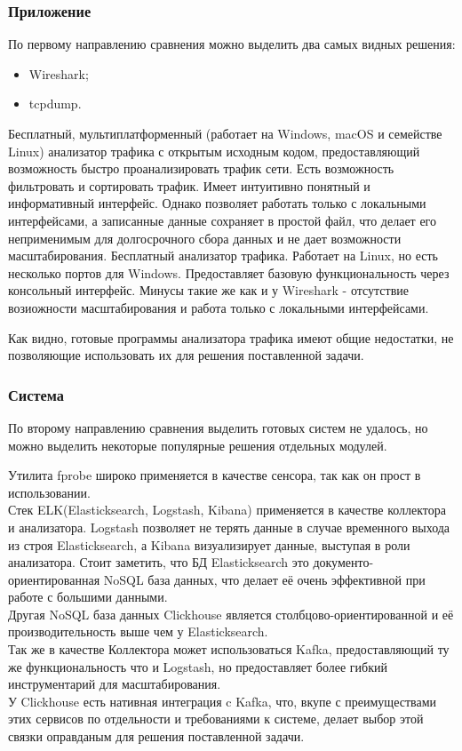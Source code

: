 \subsubsection{ Приложение }
По первому направлению сравнения можно выделить два самых видных решения:
\begin{itemize}
	\item Wireshark;
	\item tcpdump.
\end{itemize}

Бесплатный, мультиплатформенный (работает на Windows, macOS и семействе Linux) анализатор трафика с открытым исходным кодом, предоставляющий возможность быстро проанализировать трафик сети\cite{wireshark}. Есть возможность фильтровать и сортировать трафик. Имеет интуитивно понятный и информативный интерфейс. Однако позволяет работать только с локальными интерфейсами, а записанные данные сохраняет в простой файл, что делает его неприменимым для долгосрочного сбора данных и не дает возможности масштабирования.
Бесплатный анализатор трафика\cite{tcpdump}. Работает на Linux, но есть несколько портов для Windows. Предоставляет базовую функциональность через консольный интерфейс. Минусы такие же как и у Wireshark - отсутствие возиожности масштабирования и работа только с локальными интерфейсами.

Как видно, готовые программы анализатора трафика имеют общие недостатки, не позволяющие использовать их для решения поставленной задачи.
\subsubsection{ Система }
По второму направлению сравнения выделить готовых систем не удалось, но можно выделить некоторые популярные решения отдельных модулей.

Утилита fprobe широко применяется в качестве сенсора, так как он прост в использовании. \\
	Стек ELK(Elasticksearch, Logstash, Kibana) применяется в качестве коллектора и анализатора. Logstash позволяет не терять данные в случае временного выхода из строя Elasticksearch, а Kibana визуализирует данные, выступая в роли анализатора. Стоит заметить, что БД Elasticksearch это документо-ориентированная NoSQL база данных, что делает её очень эффективной при работе с большими данными\cite{elastic}. \\
	Другая NoSQL база данных Clickhouse является столбцово-ориентированной и её производительность выше чем у Elasticksearch\cite{clickhouse-elastic}. \\
	Так же в качестве Коллектора может использоваться Kafka, предоставляющий ту же функциональность что и Logstash, но предоставляет более гибкий инструментарий для масштабирования. \\
	У Clickhouse есть нативная интеграция c Kafka, что, вкупе с преимуществами этих сервисов по отдельности и требованиями к системе, делает выбор этой связки оправданым для решения поставленной задачи\cite{clickhouse-kafka}.

